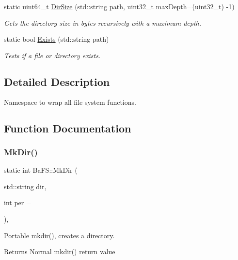 \begin{Indent}
\begin{DoxyCompactItemize}
static uint64\+\_\+t \hyperlink{namespaceBaFS_acfbdc7327ac781f0e3087eb03d37ef35}{Dir\+Size} (std\+::string path, uint32\+\_\+t max\+Depth=(uint32\+\_\+t) -\/1)
\begin{DoxyCompactList}\small\item\em Gets the directory size in bytes recursively with a maximum depth. \end{DoxyCompactList}\item 
static bool \hyperlink{namespaceBaFS_a73d165c90a00491cfe0b9ce3b5fe5c58}{Exists} (std\+::string path)
\begin{DoxyCompactList}\small\item\em Tests if a file or directory exists. \end{DoxyCompactList}\end{DoxyCompactItemize}
\end{Indent}


\subsection{Detailed Description}
Namespace to wrap all file system functions. 

\subsection{Function Documentation}
\mbox{\label{namespaceBaFS_a9e6346a9784d4de1dbda3c79ef8bb72b}} 
\subsubsection{\texorpdfstring{Mk\+Dir()}{MkDir()}}
{\footnotesize\ttfamily static int Ba\+F\+S\+::\+Mk\+Dir (\begin{DoxyParamCaption}\item[{std\+::string}]{dir,  }\item[{int}]{per = {} }\end{DoxyParamCaption})\hspace{0.3cm}{\ttfamily [inline]}, {\ttfamily [static]}}



Portable mkdir(), creates a directory. 

\begin{DoxyReturn}{Returns}
Normal mkdir() return value 
\end{DoxyReturn}

